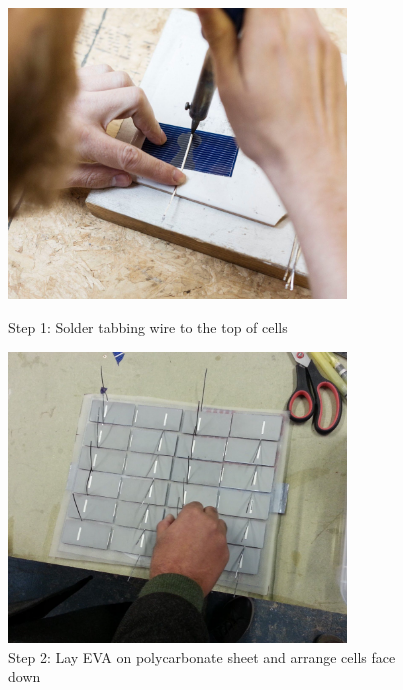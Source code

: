 \documentclass{article}
\theoremstyle{definition}
\theoremstyle{definition}
\theoremstyle{remark}
\begin{document}
  \begin{figure}[!ht]
    \begin{minipage}{0.25\textwidth}
        \centering
        \includegraphics[width=0.8\textwidth]{../Images/image_3_1_(step_1).png}
        \caption*{Step 1: Solder tabbing wire to the top of cells}
    \end{minipage}\hfill
    \begin{minipage}{0.25\textwidth}
        \centering
        \includegraphics[width=0.8\textwidth]{../Images/image_3_2_(step_2).png}
        \caption*{Step 2: Lay EVA on polycarbonate sheet and arrange cells face down}
    \end{minipage}\hfill
    \begin{minipage}{0.25\textwidth}
        \centering

\end{minipage}
\end{figure}
\end{document}
